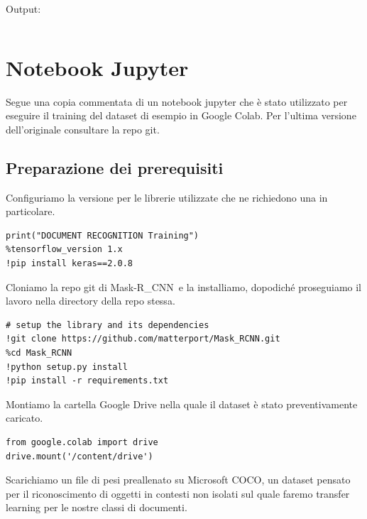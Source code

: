 \documentclass[12pt,a4paper]{article}
\newcommand{\mrcnn}{Mask-R\_CNN}
\begin{document}
Output:
\inputminted{python}{test_background.py}

\pagebreak

\section{Notebook Jupyter}
\label{s:notebook}


Segue una copia commentata di un notebook jupyter che è stato utilizzato
per eseguire il training del dataset di esempio in Google Colab. Per
l'ultima versione dell'originale consultare la repo git.

\subsection{Preparazione dei prerequisiti}

Configuriamo la versione per le librerie utilizzate che ne richiedono
una in particolare.

\begin{verbatim}
print("DOCUMENT RECOGNITION Training")
%tensorflow_version 1.x
!pip install keras==2.0.8
\end{verbatim}

Cloniamo la repo git di \mrcnn\ e la installiamo, dopodiché proseguiamo
il lavoro nella directory della repo stessa.

\begin{verbatim}
# setup the library and its dependencies
!git clone https://github.com/matterport/Mask_RCNN.git
%cd Mask_RCNN
!python setup.py install
!pip install -r requirements.txt
\end{verbatim}

Montiamo la cartella Google Drive nella quale il dataset è stato
preventivamente caricato.

\begin{verbatim}
from google.colab import drive
drive.mount('/content/drive')
\end{verbatim}

Scarichiamo un file di pesi preallenato su Microsoft COCO, un dataset
pensato per il riconoscimento di oggetti in contesti non isolati sul
quale faremo transfer learning per le nostre classi di documenti.
\end{document}
